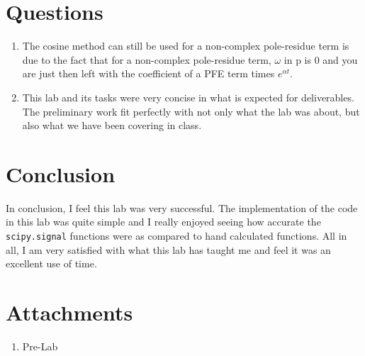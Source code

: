 \documentclass[12pt]{report}
\begin{document}
\section{Questions}
\begin{enumerate}
  \item The cosine method can still be used for a non-complex pole-residue term is due to the fact that for a non-complex pole-residue term, $\omega$ in p is 0
  and you are just then left with the coefficient of a PFE term times $e^{\alpha t}$. 
  \item This lab and its tasks were very concise in what is expected for deliverables. The preliminary work fit perfectly with not only what the lab was about,
  but also what we have been covering in class.
\end{enumerate}
\section{Conclusion}
In conclusion, I feel this lab was very successful. The implementation of the code in this lab was quite simple and I really enjoyed seeing how accurate the 
\texttt{scipy.signal} functions were as compared to hand calculated functions. All in all, I am very satisfied with what this lab has taught me and feel it was an excellent use of time.
\newpage
\thispagestyle{customblank}
\section{Attachments}\label{section: Attachments}
\centering\begin{enumerate}
  \item Pre-Lab
\end{enumerate}
\vspace*{\fill}


% 


\end{document}
